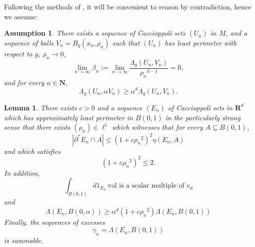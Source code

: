 \documentclass[reqno,12pt,letterpaper]{amsart}
\newcommand{\NN}{\mathbf{N}}
\newcommand{\RR}{\mathbf{R}}
\newcommand{\vol}{\mathrm{vol}}
\newtheorem{lemma}[theorem]{Lemma}
\newtheorem{assumption}[theorem]{Assumption}
\theoremstyle{definition}
\numberwithin{equation}{section}
\begin{document}
Following the methods of \cite[\S4-5]{Miranda66}, it will be convenient to reason by contradiction, hence we assume:

\begin{assumption} \label{DGL contradictor}
There exists a sequence of Caccioppoli sets $(U_n)$ in $M$, and a sequence of balls $V_n = B_g(x_n, \rho_n)$ such that $(U_n)$ has least perimeter with respect to $g$, $\rho_n \to 0$,
$$\lim_{n \to \infty} \beta_n := \lim_{n \to \infty} \frac{\Lambda_g(U_n, V_n)}{{\rho_n}^{d - 1}} = 0,$$
and for every $n \in \NN$,
\begin{equation}\label{contradiction DGL}
\Lambda_g(U_n, \alpha V_n) \geq \alpha^d \Lambda_g(U_n, V_n).
\end{equation}
\end{assumption}

\begin{lemma}
There exists $c > 0$ and a sequence $(E_n)$ of Caccioppoli sets in $\RR^d$ which has approximately least perimeter in $B(0, 1)$ in the particularly strong sense that there exists $(\rho_n) \in \ell^1$ which witnesses that for every $A \subseteq B(0, 1)$,
\begin{equation}\label{DGL ALP}
|\partial^* E_n \cap A| \leq (1 + c{\rho_n}^2)^2 \eta(E_n, A)
\end{equation}
and which satisfies
\begin{equation}\label{DGL bound by 2}
(1 + c{\rho_n}^2)^2 \leq 2.
\end{equation}
In addition,
\begin{equation}\label{DGL conormal axis}
\int_{B(0, 1)} d1_{E_n} ~\vol \text{ is a scalar multiple of } v_d
\end{equation}
and
\begin{equation}\label{scaled contradiction DGL}
\Lambda(E_n, B(0, \alpha)) \geq \alpha^d(1 + c{\rho_n}^2) \Lambda(E_n, B(0, 1))
\end{equation}
Finally, the sequences of excesses
\begin{equation}\label{scaled summable DGL}
\gamma_n = \Lambda(E_n, B(0, 1))
\end{equation}
is summable.
\end{lemma}
\end{document}

